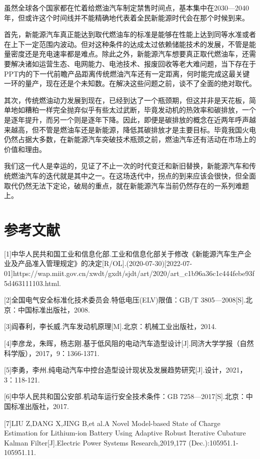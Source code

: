 \documentclass[12pt,UTF8]{ctexbook}
\begin{document}
虽然全球各个国家都在忙着给燃油汽车制定禁售时间点，基本集中在2030—2040年，但或许这个时间线并不能精确地代表着全民新能源时代会在那个时候到来。

首先，新能源汽车真正能达到取代燃油车的标准是能够在性能上达到同等水准或者在上下一定范围内波动。但对这种条件的达成太过依赖储能技术的发展，不管是能量密度还是充电速率都是难点。除此之外，新能源汽车想要真正取代燃油车，还需要解决诸如运营生态、电网能力、电池技术、报废回收等老大难问题，当下存在于PPT内的下一代前瞻产品距离传统燃油汽车还有一定距离，何时能完成这最关键一环的量产，现在还是个未知数。在解决这些问题之前，谈不了全面的绝对取代。

其次，传统燃油动力发展到现在，已经到达了一个瓶颈期，但这并非是天花板，简单地如糟粕一样完全抛弃似乎有些太过武断，毕竟发动机的热效率和碳排放，一个是逐年提升，而另一个则是逐年下降。因此，即便是碳排放的概念在近两年呼声越来越高，但不管是燃油车还是新能源，降低其碳排放才是主要目标。毕竟我国火电仍然占据大多数，在新能源汽车突破技术瓶颈之前，燃油汽车还有活动在市场上的价值和理由。

我们这一代人是幸运的，见证了不止一次的时代变迁和新旧替换，新能源汽车和传统燃油汽车的迭代就是其中之一。在这场迭代中，拐点的到来应该会很快，但全面取代仍然无法下定论，破局的重点，就在新能源汽车当前仍然存在的一系列难题上。

\chapter{参考文献}

[1]中华人民共和国工业和信息化部.工业和信息化部关于修改《新能源汽车生产企业及产品准入管理规定》的决定[R/OL].(2020-07-30)[2022-07-01]https://wap.miit.gov.cn/xwdt/gxdt/sjdt/art/2020/art_c1b96a36c1c444febe93f5d463111103.html.

[2]全国电气安全标准化技术委员会.特低电压(ELV)限值：GB/T 3805—2008[S].北京：中国标准出版社，2008.

[3]阎春利，李长威.汽车发动机原理[M].北京：机械工业出版社，2014.

[4]李彦龙，朱晖，杨志刚.基于低风阻的电动汽车造型设计[J].同济大学学报（自然科学版），2017，9：1366-1371.

[5]李勇，李州.纯电动汽车中控台造型设计现状及发展趋势研究[J].设计，2021，3：118-121.

[6]中华人民共和国公安部.机动车运行安全技术条件：GB 7258—2017[S].北京：中国标准出版社，2017.

[7]LIU Z,DANG X,JING B,et al.A Novel Model-based State of Charge Estimation for Lithium-ion Battery Using Adaptive Robust Iterative Cubature Kalman Filter[J].Electric Power Systems Research,2019,177 (Dec.):105951.1-105951.11.
\end{document}
